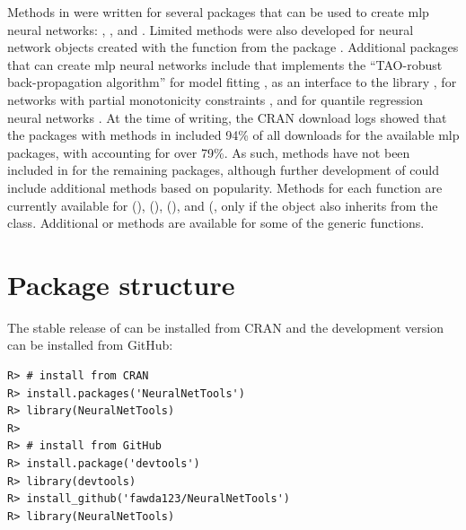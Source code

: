 \documentclass[article,shortnames]{jss}\usepackage[]{graphicx}\usepackage[]{color}
\makeatletter
\newenvironment{kframe}{%
 \def\at@end@of@kframe{}%
 \ifinner\ifhmode%
  \def\at@end@of@kframe{\end{minipage}}%
  \begin{minipage}{\columnwidth}%
 \fi\fi%
 \def\FrameCommand##1{\hskip\@totalleftmargin \hskip-\fboxsep
 \colorbox{shadecolor}{##1}\hskip-\fboxsep
     \hskip-\linewidth \hskip-\@totalleftmargin \hskip\columnwidth}%
 \MakeFramed {\advance\hsize-\width
   \@totalleftmargin\z@ \linewidth\hsize
   \@setminipage}}%
 {\par\unskip\endMakeFramed%
 \at@end@of@kframe}
\newenvironment{knitrout}{}{} %
\makeatother
\begin{document}
Methods in  were written for several  packages that can be used to create \ac{mlp} neural networks:  \citep{Fritsch12},  \citep{Venables02}, and  \citep{Bergmeir12}. Limited methods were also developed for neural network objects created with the  function from the  package \citep{Kuhn15}.  Additional  packages that can create \ac{mlp} neural networks include  that implements the ``TAO-robust back-propagation algorithm'' for model fitting \citep{Castejon14},  as an  interface to the   library \citep{Klima15},  for networks with partial monotonicity constraints \citep{Cannon15}, and  for quantile regression neural networks \citep{Cannon11}.  At the time of writing, the \ac{CRAN} download logs \citep{Csardi15} showed that the  packages with methods in  included 94\% of all downloads for the available \ac{mlp} packages, with  accounting for over 79\%.  As such, methods have not been included in  for the remaining packages, although further development of  could include additional methods based on popularity.  Methods for each function are currently available for   (),  (),  (), and  (, only if the object also inherits from the  class.  Additional  or  methods are available for some of the generic functions.

\section[Package structure]{Package structure}

The stable release of  can be installed from \ac{CRAN} and the development version can be installed from GitHub:

\begin{knitrout}
\color{fgcolor}\begin{kframe}
\begin{verbatim}
R> # install from CRAN
R> install.packages('NeuralNetTools')
R> library(NeuralNetTools)
R> 
R> # install from GitHub
R> install.package('devtools')
R> library(devtools)
R> install_github('fawda123/NeuralNetTools')
R> library(NeuralNetTools)
\end{verbatim}
\end{kframe}
\end{knitrout}
\end{document}
